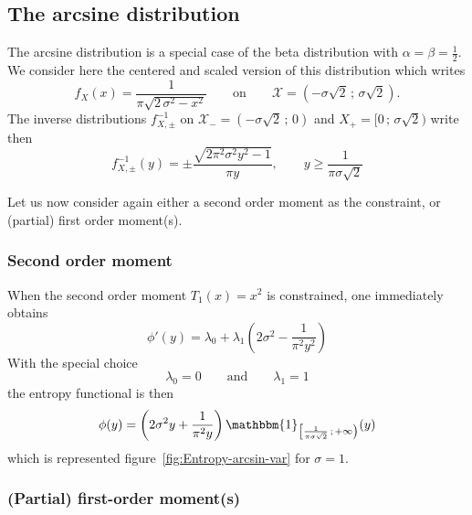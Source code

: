 \documentclass[english]{elsarticle}
\theoremstyle{definition}
\theoremstyle{plain}
\theoremstyle{plain}
\def\X{\mathcal{X}}
\def\un{\mathbbm{1}}
\begin{document}



\subsection{The arcsine distribution}

\label{subsec:Arcsine}

The arcsine distribution is a special case of the beta distribution
with $\alpha=\beta=\frac{1}{2}$. We consider here the centered and
scaled version of this distribution which writes 
\[
f_{X}(x)=\frac{1}{\pi\sqrt{2\,\sigma^{2}-x^{2}}}\qquad\mbox{on}\qquad\X=(-\sigma\sqrt{2}\,;\,\sigma\sqrt{2}).
\]
The inverse distributions $f_{X,\pm}^{-1}$ on $\X_{-}=(-\sigma\sqrt{2}\,;\,0)$
and $X_{+}=[0\,;\,\sigma\sqrt{2})$ write then 
\[
f_{X,\pm}^{-1}(y)=\pm\frac{\sqrt{2\pi^{2}\sigma^{2}y^{2}-1}}{\pi y},\qquad y\ge\frac{1}{\pi\sigma\sqrt{2}}
\]


Let us now consider again either a second order moment as the constraint,
or (partial) first order moment(s).




\subsubsection{Second order moment}

When the second order moment $T_{1}(x)=x^{2}$ is constrained, one
immediately obtains 
\[
\phi'(y)=\lambda_{0}+\lambda_{1}\left(2\sigma^{2}-\frac{1}{\pi^{2}y^{2}}\right)
\]
With the special choice 
\[
\lambda_{0}=0\qquad\mbox{and}\qquad\lambda_{1}=1
\]
the entropy functional is then 
\[
\phi(y)=\left(2\sigma^{2}y+\frac{1}{\pi^{2}y}\right)\un_{\left[\frac{1}{\pi\sigma\sqrt{2}}\,;\,+\infty\right)}(y)
\]
which is represented figure~\ref{fig:Entropy-arcsin-var} for $\sigma=1$.




\subsubsection{(Partial) first-order moment(s)}
\end{document}
